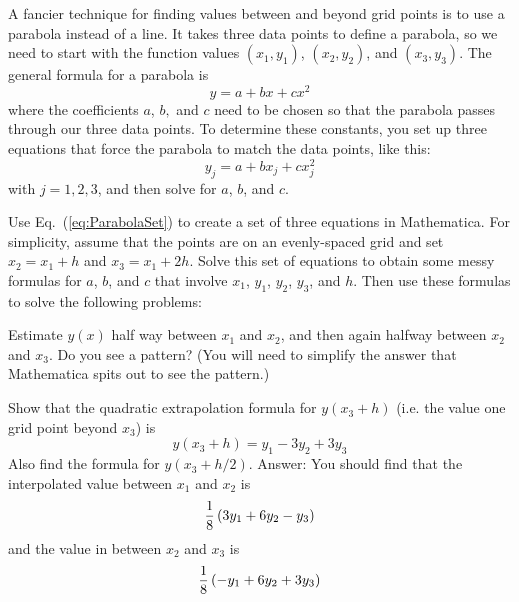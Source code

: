 
A fancier technique for finding values between and beyond grid points
is to use a parabola instead of a line. It takes three data points to
define a parabola, so we need to start with the function values
$(x_1,y_1)$, $(x_2,y_2)$, and $(x_3,y_3)$. The general formula for a
parabola is
\begin{equation}\label{eq:Parabola}
    y=a + bx + cx^2
\end{equation}
where the coefficients $a$, $b,$ and $c$ need to be chosen so that
the parabola passes through our three data points. To determine these
constants, you set up three equations that force the parabola to
match the data points, like this:
\begin{equation}\label{eq:ParabolaSet}
    y_j = a + bx_j + cx_j^2
\end{equation}
with $j=1,2,3$, and then solve for $a$, $b$, and $c$.

\begin{enumerate}
\probtwo \label{P:1.4} Use Eq.~(\ref{eq:ParabolaSet}) to create a
    set of three equations in Mathematica. For simplicity, assume
    that the points are on an evenly-spaced grid and set
    $x_2=x_1+h$ and $x_3=x_1+2h$.  Solve this set of equations to
    obtain some messy formulas for $a$, $b$, and $c$ that involve
    $x_1$, $y_1$, $y_2$, $y_3$, and $h$. Then use these formulas to solve the following
    problems:

\begin{enumerate}

\subprob Estimate $y(x)$ half way between $x_1$ and $x_2$,
    and then again halfway between $x_2$ and $x_3$. Do you
    see a pattern? (You will need to simplify the answer that
    Mathematica spits out to see the pattern.)

\subprob Show that the quadratic extrapolation formula for
    $y(x_3+h)$ (i.e. the value one grid point beyond $x_3$)
    is
    \begin{equation}\label{eq:quadExtrap}
        y(x_3+h) = y_1 - 3 y_2 + 3 y_3
    \end{equation}
    Also find the formula for $y(x_3+h/2)$.
\ifsolutions
Answer:  You should find that the interpolated value between $x_1$ and
$x_2$ is
\begin{equation}
{1\over 8} \left( 3 y_1 + 6 y_2 - y_3\right)
\end{equation}
and the value in between $x_2$ and $x_3$ is
\begin{equation}
{1\over 8} \left( - y_1 + 6 y_2 + 3 y_3\right)
\end{equation}

\fi
\end{enumerate}
\end{enumerate}

